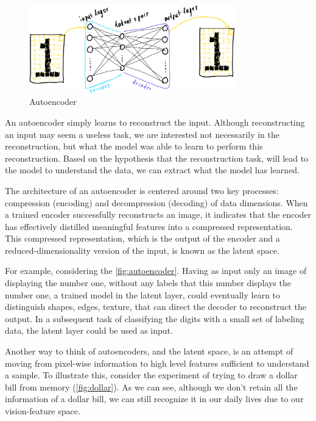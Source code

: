 \documentclass[12pt, a4paper]{article}
\begin{document}
\begin{figure}[h!]
  \centering
  \includegraphics[width=0.8\textwidth]{autoencoder.png}
  \caption{Autoencoder}
  \label{fig:autoencoder}
\end{figure}

An autoencoder simply learns to reconstruct the input. Although reconstructing an input may seem a useless task, we are interested not necessarily in the reconstruction, but what the model was able to learn to perform this reconstruction. Based on the hypothesis that the reconstruction task, will lead to the model to understand the data, we can extract what the model has learned. 

The architecture of an autoencoder is centered around two key processes: compression (encoding) and decompression (decoding) of data dimensions. When a trained encoder successfully reconstructs an image, it indicates that the encoder has effectively distilled meaningful features into a compressed representation. This compressed representation, which is the output of the encoder and a reduced-dimensionality version of the input, is known as the latent space.

For example, considering the \autoref{fig:autoencoder}. Having as input only an image of displaying the number one, without any labels that this number displays the number one, a trained model in the latent layer, could eventually learn to distinguish shapes, edges, texture, that can direct the decoder to reconstruct the output. In a subsequent task of classifying the digits with a small set of labeling data, the latent layer could be used as input.

Another way to think of autoencoders, and the latent space, is an attempt of moving from pixel-wise information to high level features sufficient to understand a sample. To illustrate this, consider the experiment of trying to draw a dollar bill from memory (\autoref{fig:dollar}). As we can see, although we don't retain all the information of a dollar bill, we can still recognize it in our daily lives due to our vision-feature space.
\end{document}

